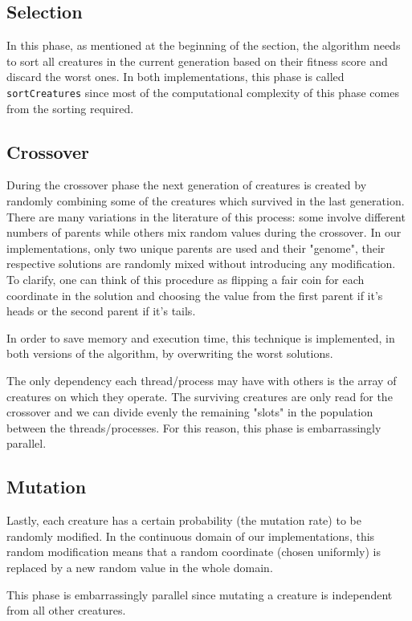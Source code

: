 \documentclass[12pt,a4paper,oneside]{article}
\begin{document}
	\subsection{Selection}
	In this phase, as mentioned at the beginning of the section, the algorithm needs to sort all creatures in the current generation based on their fitness score and discard the worst ones.
	In both implementations, this phase is called \texttt{sortCreatures} since most of the computational complexity of this phase comes from the sorting required.

	\subsection{Crossover}
	During the crossover phase the next generation of creatures is created by randomly combining some of the creatures which survived in the last generation.
	There are many variations in the literature of this process: some involve different numbers of parents while others mix random values during the crossover.
	In our implementations, only two unique parents are used and their "genome", their respective solutions are randomly mixed without introducing any modification.
	To clarify, one can think of this procedure as flipping a fair coin for each coordinate in the solution and choosing the value from the first parent if it's heads or the second parent if it's tails.

	In order to save memory and execution time, this technique is implemented, in both versions of the algorithm, by overwriting the worst solutions.

	The only dependency each thread/process may have with others is the array of creatures on which they operate. The surviving creatures are only read for the crossover and we can divide evenly the remaining "slots" in the population between the threads/processes. For this reason, this phase is embarrassingly parallel.

	\subsection{Mutation}
	Lastly, each creature has a certain probability (the mutation rate) to be randomly modified. In the continuous domain of our implementations, this random modification means that a random coordinate (chosen uniformly) is replaced by a new random value in the whole domain.

	This phase is embarrassingly parallel since mutating a creature is independent from all other creatures.
\end{document}
